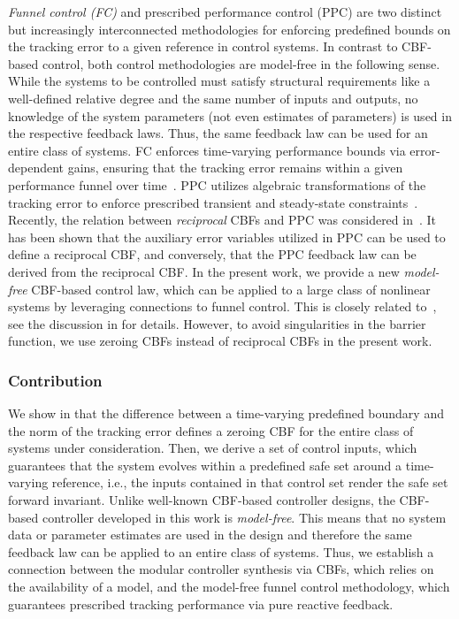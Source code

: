 \documentclass[journal,twoside,web]{ieeeconf}
\begin{document}
\textit{Funnel control (FC)} and prescribed performance control (PPC) are two distinct but increasingly interconnected methodologies for enforcing predefined bounds on the tracking error to a given reference
in control systems. 
In contrast to CBF-based control, both control methodologies are model-free in the following sense. While the systems to be controlled must satisfy structural requirements like a well-defined relative degree and the same number of inputs and outputs, no knowledge of the system parameters (not even estimates of parameters) is used in the respective feedback laws. Thus, the same feedback law can be used for an entire class of systems.
FC enforces time-varying performance bounds via error-dependent gains, ensuring that the tracking error remains within a given performance funnel over time~\cite{IlchRyan02b,berger2018funnel,BergIlch21}. PPC utilizes algebraic transformations of the tracking error to enforce prescribed transient and steady-state constraints~\cite{bechlioulis2008robust,kostarigka2011adaptive,bechlioulis2014low}.\\
%
Recently, the relation between \textit{reciprocal} CBFs and PPC was considered in~\cite{namerikawa2024equivalence}.
It has been shown that the auxiliary error variables utilized in PPC can be used to define a reciprocal CBF, and conversely, that the PPC feedback law can be derived from the reciprocal CBF.
In the present work, we provide a new \textit{model-free} CBF-based control law, which can be applied to a large class of nonlinear systems by leveraging connections to funnel control. This is closely related to~\cite{namerikawa2024equivalence}, see the discussion in  for details.
However, to avoid singularities in the barrier function, we use zeroing CBFs instead of reciprocal CBFs in the present work.

\subsubsection*{Contribution}
We show in  that the difference between a time-varying predefined boundary and the norm of the tracking error defines a zeroing CBF for the entire class of systems under consideration.
Then, we derive a set of control inputs, which guarantees that the system evolves within a predefined safe set around a time-varying reference, i.e., the inputs contained in that control set render the safe set forward invariant.
Unlike well-known CBF-based controller designs, the CBF-based controller developed in this work is \textit{model-free}.
This means that no system data or parameter estimates are used in the design and therefore the same feedback law can be applied to an entire class of systems. 
Thus, we establish a connection between the modular controller synthesis via CBFs, which relies on the availability of a model, and the model-free funnel control methodology, which guarantees prescribed tracking performance via pure reactive feedback.
\end{document}
